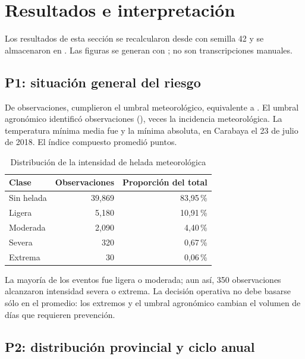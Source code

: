 \documentclass[11pt,a4paper]{article}
\begin{document}
\section{Resultados e interpretación}

Los resultados de esta sección se recalcularon desde  con
semilla 42 y se almacenaron en . Las figuras se generan con
; no son transcripciones manuales.

\subsection{P1: situación general del riesgo}

De \NRegistros{} observaciones, \NHeladas{} cumplieron el umbral meteorológico, equivalente
a \TasaHelada{}. El umbral agronómico identificó \NHeladasAgronomicas{} observaciones
(\TasaHeladaAgronomica{}), \FactorAgronomico{} veces la incidencia meteorológica. La
temperatura mínima media fue \TminMedia{} y la mínima absoluta, \TminAbsoluta{} en
Carabaya el 23 de julio de 2018. El índice compuesto promedió \RiesgoMedio{} puntos.

\begin{table}[H]
\centering
\caption{Distribución de la intensidad de helada meteorológica}
\label{tab:intensidad}
\begin{tabular}{lrr}
\toprule
Clase & Observaciones & Proporción del total \\
\midrule
Sin helada & 39,869 & 83,95\,\% \\
Ligera & 5,180 & 10,91\,\% \\
Moderada & 2,090 & 4,40\,\% \\
Severa & 320 & 0,67\,\% \\
Extrema & 30 & 0,06\,\% \\
\bottomrule
\end{tabular}
\end{table}

La mayoría de los eventos fue ligera o moderada; aun así, 350 observaciones alcanzaron
intensidad severa o extrema. La decisión operativa no debe basarse sólo en el promedio:
los extremos y el umbral agronómico cambian el volumen de días que requieren prevención.

\subsection{P2: distribución provincial y ciclo anual}
\end{document}

